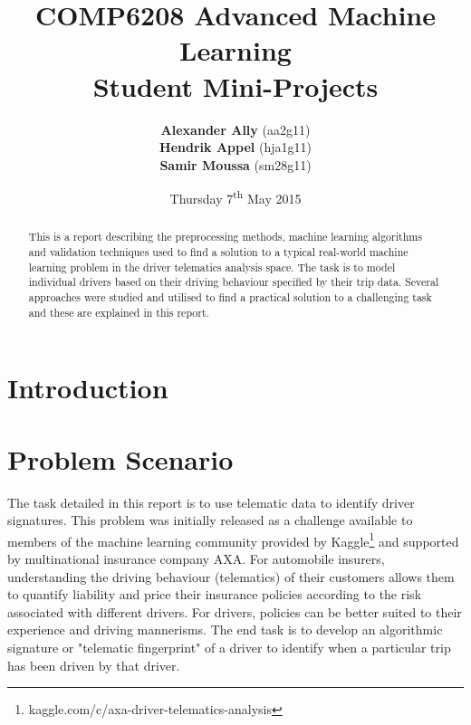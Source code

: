 \documentclass[a4paper, 11pt, twocolumn]{report}
\begin{document}
\lstset{language=Matlab, basicstyle=\small}
\title{\textbf{COMP6208 Advanced Machine Learning} \\
{\Large Student Mini-Projects}}

\author{\textbf{Alexander Ally} (aa2g11)\\
\textbf{Hendrik Appel} (hja1g11)\\
\textbf{Samir Moussa} (sm28g11)}

\date{Thursday 7\textsuperscript{th} May 2015}
\maketitle

\begin{abstract}

This is a report describing the preprocessing methods, machine learning algorithms and validation techniques used to find a solution to a typical real-world machine learning problem in the driver telematics analysis space. The task is to model individual drivers based on their driving behaviour specified by their trip data. Several approaches were studied and utilised to find a practical solution to a challenging task and these are explained in this report.

\end{abstract}

\section{Introduction}





\section{Problem Scenario}

The task detailed in this report is to use telematic data to identify driver signatures. This problem was initially released as a challenge available to members of the machine learning community provided by Kaggle\footnote{kaggle.com/c/axa-driver-telematics-analysis} and supported by multinational insurance company AXA. For automobile insurers, understanding the driving behaviour (telematics) of their customers allows them to quantify liability and price their insurance policies according to the risk associated with different drivers. For drivers, policies can be better suited to their experience and driving mannerisms. The end task is to develop an algorithmic signature or "telematic fingerprint" of a driver to identify when a particular trip has been driven by that driver.
\end{document}
